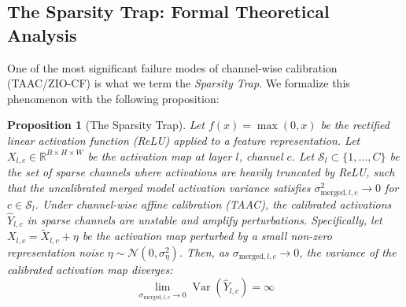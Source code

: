 \documentclass{article}
\theoremstyle{plain}
\newtheorem{proposition}[theorem]{Proposition}
\theoremstyle{definition}
\theoremstyle{remark}
\begin{document}
\subsection{The Sparsity Trap: Formal Theoretical Analysis}
One of the most significant failure modes of channel-wise calibration (TAAC/ZIO-CF) is what we term the \textit{Sparsity Trap}. We formalize this phenomenon with the following proposition:

\begin{proposition}[The Sparsity Trap]
Let $f(x) = \max(0, x)$ be the rectified linear activation function (ReLU) applied to a feature representation. Let $X_{l, c} \in \mathbb{R}^{B \times H \times W}$ be the activation map at layer $l$, channel $c$. Let $\mathcal{S}_l \subset \{1, \dots, C\}$ be the set of sparse channels where activations are heavily truncated by ReLU, such that the uncalibrated merged model activation variance satisfies $\sigma_{\text{merged}, l, c}^2 \to 0$ for $c \in \mathcal{S}_l$. Under channel-wise affine calibration (TAAC), the calibrated activations $\hat{Y}_{l, c}$ in sparse channels are unstable and amplify perturbations. Specifically, let $X_{l, c} = \tilde{X}_{l, c} + \eta$ be the activation map perturbed by a small non-zero representation noise $\eta \sim \mathcal{N}(0, \sigma_{\eta}^2)$. Then, as $\sigma_{\text{merged}, l, c} \to 0$, the variance of the calibrated activation map diverges:
\begin{equation}
    \lim_{\sigma_{\text{merged}, l, c} \to 0} \operatorname{Var}(\hat{Y}_{l, c}) = \infty
\end{equation}
\end{proposition}
\end{document}
